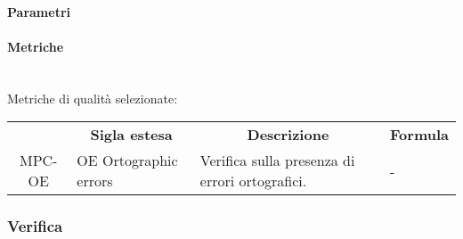 \paragraph{Parametri}
\paragraph{Metriche}\mbox{}\\
Metriche di qualità selezionate:
\begin{table}[H]
    \centering
    \renewcommand{\arraystretch}{1.8}
    \begin{tabular}{| c | p{4.2cm} | p{5cm} | p{2cm} |  }
        \rowcolor[HTML]{a52a2a}
        \multicolumn{1}{c}{\color[HTML]{FFFFFF} \textbf{Codice}}       &
        \multicolumn{1}{c}{\color[HTML]{FFFFFF} \textbf{Sigla estesa}} &
        \multicolumn{1}{c}{\color[HTML]{FFFFFF} \textbf{Descrizione}}  &
        \multicolumn{1}{c}{\color[HTML]{FFFFFF} \textbf{Formula}}                                                                  \\
        MPC-OE                                                         & OE Ortographic errors & Verifica sulla presenza di errori
        ortografici.                                                   & -                                                         \\
        \hline
    \end{tabular}
\end{table}
\subsubsection{Verifica}


